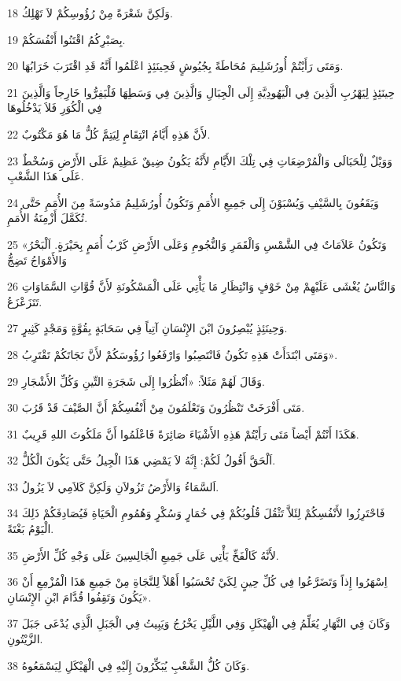 \par 18 وَلَكِنَّ شَعْرَةً مِنْ رُؤُوسِكُمْ لاَ تَهْلِكُ.
\par 19 بِصَبْرِكُمُ اقْتَنُوا أَنْفُسَكُمْ.
\par 20 وَمَتَى رَأَيْتُمْ أُورُشَلِيمَ مُحَاطَةً بِجُيُوشٍ فَحِينَئِذٍ اعْلَمُوا أَنَّهُ قَدِ اقْتَرَبَ خَرَابُهَا.
\par 21 حِينَئِذٍ لِيَهْرُبِ الَّذِينَ فِي الْيَهُودِيَّةِ إِلَى الْجِبَالِ وَالَّذِينَ فِي وَسَطِهَا فَلْيَفِرُّوا خَارِجاً وَالَّذِينَ فِي الْكُوَرِ فَلاَ يَدْخُلُوهَا
\par 22 لأَنَّ هَذِهِ أَيَّامُ انْتِقَامٍ لِيَتِمَّ كُلُّ مَا هُوَ مَكْتُوبٌ.
\par 23 وَوَيْلٌ لِلْحَبَالَى وَالْمُرْضِعَاتِ فِي تِلْكَ الأَيَّامِ لأَنَّهُ يَكُونُ ضِيقٌ عَظِيمٌ عَلَى الأَرْضِ وَسُخْطٌ عَلَى هَذَا الشَّعْبِ.
\par 24 وَيَقَعُونَ بِالسَّيْفِ وَيُسْبَوْنَ إِلَى جَمِيعِ الأُمَمِ وَتَكُونُ أُورُشَلِيمُ مَدُوسَةً مِنَ الأُمَمِ حَتَّى تُكَمَّلَ أَزْمِنَةُ الأُمَمِ.
\par 25 «وَتَكُونُ عَلاَمَاتٌ فِي الشَّمْسِ وَالْقَمَرِ وَالنُّجُومِ وَعَلَى الأَرْضِ كَرْبُ أُمَمٍ بِحَيْرَةٍ. اَلْبَحْرُ وَالأَمْوَاجُ تَضِجُّ
\par 26 وَالنَّاسُ يُغْشَى عَلَيْهِمْ مِنْ خَوْفٍ وَانْتِظَارِ مَا يَأْتِي عَلَى الْمَسْكُونَةِ لأَنَّ قُوَّاتِ السَّمَاوَاتِ تَتَزَعْزَعُ.
\par 27 وَحِينَئِذٍ يُبْصِرُونَ ابْنَ الإِنْسَانِ آتِياً فِي سَحَابَةٍ بِقُوَّةٍ وَمَجْدٍ كَثِيرٍ.
\par 28 وَمَتَى ابْتَدَأَتْ هَذِهِ تَكُونُ فَانْتَصِبُوا وَارْفَعُوا رُؤُوسَكُمْ لأَنَّ نَجَاتَكُمْ تَقْتَرِبُ».
\par 29 وَقَالَ لَهُمْ مَثَلاً: «اُنْظُرُوا إِلَى شَجَرَةِ التِّينِ وَكُلِّ الأَشْجَارِ.
\par 30 مَتَى أَفْرَخَتْ تَنْظُرُونَ وَتَعْلَمُونَ مِنْ أَنْفُسِكُمْ أَنَّ الصَّيْفَ قَدْ قَرُبَ.
\par 31 هَكَذَا أَنْتُمْ أَيْضاً مَتَى رَأَيْتُمْ هَذِهِ الأَشْيَاءَ صَائِرَةً فَاعْلَمُوا أَنَّ مَلَكُوتَ اللهِ قَرِيبٌ.
\par 32 اَلْحَقَّ أَقُولُ لَكُمْ: إِنَّهُ لاَ يَمْضِي هَذَا الْجِيلُ حَتَّى يَكُونَ الْكُلُّ.
\par 33 اَلسَّمَاءُ وَالأَرْضُ تَزُولاَنِ وَلَكِنَّ كَلاَمِي لاَ يَزُولُ.
\par 34 فَاحْتَرِزُوا لأَنْفُسِكُمْ لِئَلاَّ تَثْقُلَ قُلُوبُكُمْ فِي خُمَارٍ وَسُكْرٍ وَهُمُومِ الْحَيَاةِ فَيُصَادِفَكُمْ ذَلِكَ الْيَوْمُ بَغْتَةً.
\par 35 لأَنَّهُ كَالْفَخِّ يَأْتِي عَلَى جَمِيعِ الْجَالِسِينَ عَلَى وَجْهِ كُلِّ الأَرْضِ.
\par 36 اِسْهَرُوا إِذاً وَتَضَرَّعُوا فِي كُلِّ حِينٍ لِكَيْ تُحْسَبُوا أَهْلاً لِلنَّجَاةِ مِنْ جَمِيعِ هَذَا الْمُزْمِعِ أَنْ يَكُونَ وَتَقِفُوا قُدَّامَ ابْنِ الإِنْسَانِ».
\par 37 وَكَانَ فِي النَّهَارِ يُعَلِّمُ فِي الْهَيْكَلِ وَفِي اللَّيْلِ يَخْرُجُ وَيَبِيتُ فِي الْجَبَلِ الَّذِي يُدْعَى جَبَلَ الزَّيْتُونِ.
\par 38 وَكَانَ كُلُّ الشَّعْبِ يُبَكِّرُونَ إِلَيْهِ فِي الْهَيْكَلِ لِيَسْمَعُوهُ.


